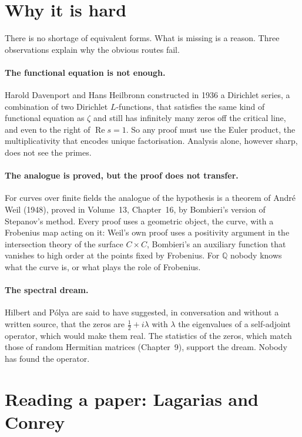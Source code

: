 \section{Why it is hard}

There is no shortage of equivalent forms. What is missing is a reason. Three observations explain why the obvious routes fail.

\paragraph{The functional equation is not enough.} Harold Davenport and Hans Heilbronn constructed in 1936 a Dirichlet series, a combination of two
Dirichlet $L$-functions, that satisfies the same kind of functional equation as $\zeta$ and still has infinitely many zeros off the critical line, and even
to the right of $\operatorname{Re}s=1$. So any proof must use the Euler product, the multiplicativity that encodes unique factorisation. Analysis alone,
however sharp, does not see the primes.

\paragraph{The analogue is proved, but the proof does not transfer.} For curves over finite fields the analogue of the hypothesis is a theorem of
Andr\'e Weil (1948), proved in Volume~13, Chapter~16, by Bombieri's version of Stepanov's method. Every proof uses a geometric object, the curve, with a
Frobenius map acting on it: Weil's own proof uses a positivity argument in the intersection theory of the surface $C\times C$, Bombieri's an auxiliary
function that vanishes to high order at the points fixed by Frobenius. For $\mathbb Q$ nobody knows what the curve is, or what plays the role of
Frobenius.

\paragraph{The spectral dream.} Hilbert and P\'olya are said to have suggested, in conversation and without a written source, that the zeros are
$\frac12+i\lambda$ with $\lambda$ the eigenvalues of a self-adjoint operator, which would make them real. The statistics of the zeros, which match
those of random Hermitian matrices (Chapter~9), support the dream. Nobody has found the operator.

\section{Reading a paper: Lagarias and Conrey}

